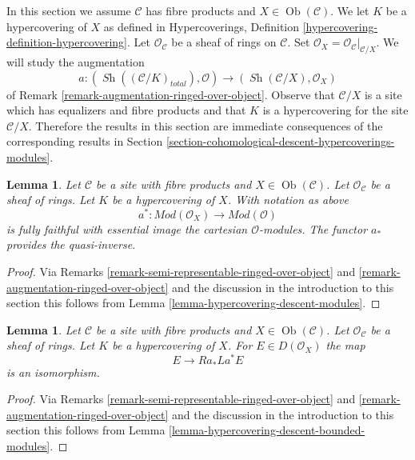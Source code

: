 \documentclass{stacks-project}
\theoremstyle{plain}
\newtheorem{lemma}[subsection]{Lemma}
\theoremstyle{definition}
\theoremstyle{remark}
\numberwithin{equation}{subsection}
\def\Ob{\mathop{\mathrm{Ob}}\nolimits}
\def\Sh{\mathop{\mathit{Sh}}\nolimits}
\begin{document}
\noindent
In this section we assume $\mathcal{C}$ has fibre products
and $X \in \Ob(\mathcal{C})$. We let $K$ be a hypercovering of $X$
as defined in
Hypercoverings, Definition \ref{hypercovering-definition-hypercovering}.
Let $\mathcal{O}_\mathcal{C}$ be a sheaf of rings on $\mathcal{C}$.
Set $\mathcal{O}_X = \mathcal{O}_\mathcal{C}|_{\mathcal{C}/X}$.
We will study the augmentation
$$
a :
(\Sh((\mathcal{C}/K)_{total}), \mathcal{O})
\longrightarrow
(\Sh(\mathcal{C}/X), \mathcal{O}_X)
$$
of Remark \ref{remark-augmentation-ringed-over-object}.
Observe that $\mathcal{C}/X$ is a site which has equalizers
and fibre products and that $K$ is a
hypercovering for the site $\mathcal{C}/X$.
Therefore the results in this section are immediate consequences
of the corresponding results in
Section \ref{section-cohomological-descent-hypercoverings-modules}.

\begin{lemma}
\label{lemma-hypercovering-X-descent-modules}
Let $\mathcal{C}$ be a site with fibre products and $X \in \Ob(\mathcal{C})$.
Let $\mathcal{O}_\mathcal{C}$ be a sheaf of rings.
Let $K$ be a hypercovering of $X$. With notation as above
$$
a^* : \textit{Mod}(\mathcal{O}_X) \to \textit{Mod}(\mathcal{O})
$$
is fully faithful with essential image the cartesian $\mathcal{O}$-modules.
The functor $a_*$ provides the quasi-inverse.
\end{lemma}

\begin{proof}
Via Remarks \ref{remark-semi-representable-ringed-over-object} and
\ref{remark-augmentation-ringed-over-object} and the discussion in
the introduction to this section
this follows from Lemma \ref{lemma-hypercovering-descent-modules}.
\end{proof}

\begin{lemma}
\label{lemma-hypercovering-X-descent-bounded-modules}
Let $\mathcal{C}$ be a site with fibre products and $X \in \Ob(\mathcal{C})$.
Let $\mathcal{O}_\mathcal{C}$ be a sheaf of rings.
Let $K$ be a hypercovering of $X$. For
$E \in D(\mathcal{O}_X)$ the map
$$
E \longrightarrow Ra_*La^*E
$$
is an isomorphism.
\end{lemma}

\begin{proof}
Via Remarks \ref{remark-semi-representable-ringed-over-object} and
\ref{remark-augmentation-ringed-over-object} and the discussion in
the introduction to this section
this follows from Lemma \ref{lemma-hypercovering-descent-bounded-modules}.
\end{proof}
\end{document}
